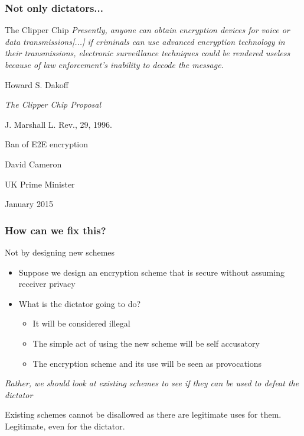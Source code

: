 \documentclass[]{beamer}
\begin{document}
\begin{frame}
\frametitle{Not only dictators...}
\begin{block}{The Clipper Chip}
{\em\color{brown} Presently, anyone can obtain encryption devices for voice or data transmissions[...]
if criminals can use advanced encryption technology in
their transmissions, electronic surveillance techniques could be rendered 
useless because of law enforcement’s inability to decode the message.}

\hfill {\color{teal} Howard S. Dakoff}

\hfill {\color{teal} {\em The Clipper Chip Proposal}}

\hfill {\color{teal} J. Marshall L. Rev., 29, 1996.}
\end{block}

\begin{block}{Ban of E2E encryption}
\color{brown}{\em
In our country, do we want to allow a means of communication between people which even in extremis, with a signed warrant from the Home Secretary personally, that we cannot read?}

\color{teal}
\hfill David Cameron

\hfill UK Prime Minister

\hfill January 2015
\end{block}
\end{frame}

\begin{frame}
\frametitle{How can we fix this?}

{\color{blue} Not by designing new schemes}

\pause

\begin{itemize}
\item Suppose we design an encryption scheme that is secure 
without assuming receiver privacy 

\item What is the dictator going to do?

    \begin{itemize}
    \item It will be considered illegal
    \item The simple act of using the new scheme will be self accusatory
    \item The encryption scheme and its use will be seen as provocations
    \end{itemize}

\end{itemize}

\pause

\vskip 1cm
{\color{brown}\em 
Rather, we should look at {\em existing} schemes to see if they can
be used to defeat the dictator
}

\pause

\vfill
Existing schemes cannot be disallowed as there are legitimate uses for
them. Legitimate, even for the dictator.
\end{frame}
\end{document}
